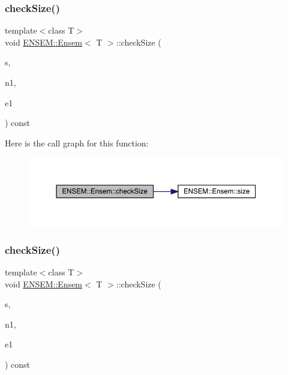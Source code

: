 \subsubsection{\texorpdfstring{checkSize()}{checkSize()}\hspace{0.1cm}{\footnotesize\ttfamily [3/4]}}
{\footnotesize\ttfamily template$<$class T$>$ \\
void \mbox{\hyperlink{classENSEM_1_1Ensem}{E\+N\+S\+E\+M\+::\+Ensem}}$<$ T $>$\+::check\+Size (\begin{DoxyParamCaption}\item[{const char $\ast$}]{s,  }\item[{int}]{n1,  }\item[{\mbox{\hyperlink{namespaceENSEM_a2dc2c4a26884f343471e52f23479ddbe}{Ensem\+Type\+\_\+t}}}]{e1 }\end{DoxyParamCaption}) const\hspace{0.3cm}{\ttfamily [inline]}}

Here is the call graph for this function\+:
\nopagebreak
\begin{figure}[H]
\begin{center}
\leavevmode
\includegraphics[width=350pt]{d7/d3e/classENSEM_1_1Ensem_a4c06fadea7b637572de2347739b78004_cgraph}
\end{center}
\end{figure}
\mbox{\label{classENSEM_1_1Ensem_a4c06fadea7b637572de2347739b78004}} 
\subsubsection{\texorpdfstring{checkSize()}{checkSize()}\hspace{0.1cm}{\footnotesize\ttfamily [4/4]}}
{\footnotesize\ttfamily template$<$class T$>$ \\
void \mbox{\hyperlink{classENSEM_1_1Ensem}{E\+N\+S\+E\+M\+::\+Ensem}}$<$ T $>$\+::check\+Size (\begin{DoxyParamCaption}\item[{const char $\ast$}]{s,  }\item[{int}]{n1,  }\item[{\mbox{\hyperlink{namespaceENSEM_a2dc2c4a26884f343471e52f23479ddbe}{Ensem\+Type\+\_\+t}}}]{e1 }\end{DoxyParamCaption}) const\hspace{0.3cm}{\ttfamily [inline]}}

